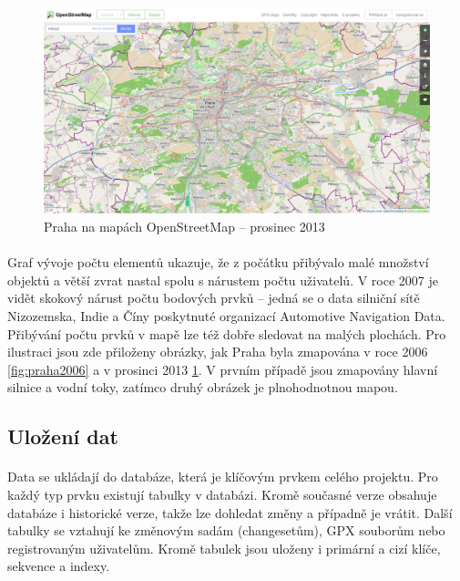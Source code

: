 \documentclass[11pt,a4paper,titlepage,oneside]{book}
\begin{document}
		\begin{figure}[!h]
			\begin{center}
				\includegraphics[width=12cm]{obrazky/Osm-201312-praha.png}
				\caption{Praha na mapách OpenStreetMap -- prosinec 2013}
				\label{fig:praha2013}
			\end{center}
		\end{figure}

		\paragraph{} Graf vývoje počtu elementů ukazuje, že z počátku přibývalo malé množství objektů a větší zvrat nastal spolu s nárustem počtu uživatelů. V roce 2007 je vidět skokový nárust počtu bodových prvků -- jedná se o data silniční sítě Nizozemska, Indie a Číny poskytnuté organizací Automotive Navigation Data. 
		Přibývání počtu prvků v mapě lze též dobře sledovat na malých plochách. Pro ilustraci jsou zde přiloženy obrázky, jak Praha byla zmapována v roce 2006 \ref{fig:praha2006} a v prosinci 2013 \ref{fig:praha2013}. V prvním případě jsou zmapovány hlavní silnice a vodní toky, zatímco druhý obrázek je plnohodnotnou mapou.
	
	\subsection{Uložení dat}
		\paragraph{} Data se ukládají do databáze, která je klíčovým prvkem celého projektu. Pro každý typ prvku existují tabulky v databázi. Kromě současné verze obsahuje databáze i historické verze, takže lze dohledat změny a případně je vrátit. Další tabulky se vztahují ke změnovým sadám (changesetům), GPX souborům nebo registrovaným uživatelům. Kromě tabulek jsou uloženy i primární a cizí klíče, sekvence a indexy.
\end{document}
